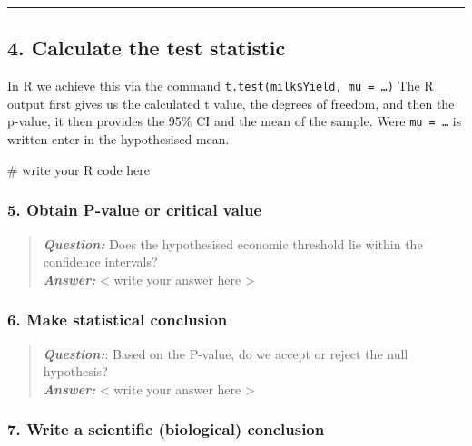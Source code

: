 \documentclass[
  10pt,
  letterpaper,
  DIV=11,
  numbers=noendperiod]{scrartcl}
\newenvironment{Shaded}{\begin{snugshade}}{\end{snugshade}}
\newcommand{\CommentTok}[1]{\textcolor[rgb]{0.37,0.37,0.37}{#1}}
\begin{document}
\begin{center}\rule{0.5\linewidth}{0.5pt}\end{center}

\hypertarget{calculate-the-test-statistic}{%
\subsection{4. Calculate the test
statistic}\label{calculate-the-test-statistic}}

In R we achieve this via the command
\texttt{t.test(milk\$Yield,\ mu\ =\ …)} The R output first gives us the
calculated t value, the degrees of freedom, and then the p-value, it
then provides the 95\% CI and the mean of the sample. Were
\texttt{mu\ =\ …} is written enter in the hypothesised mean.

\begin{Shaded}
\begin{Highlighting}[]
\CommentTok{\# write your R code here}
\end{Highlighting}
\end{Shaded}

\hypertarget{obtain-p-value-or-critical-value}{%
\subsubsection{5. Obtain P-value or critical
value}\label{obtain-p-value-or-critical-value}}

\begin{quote}
\textbf{\emph{Question:}} Does the hypothesised economic threshold lie
within the confidence intervals?\\
\textbf{\emph{Answer:}} \textless{} write your answer here
\textgreater{}
\end{quote}

\hypertarget{make-statistical-conclusion}{%
\subsubsection{6. Make statistical
conclusion}\label{make-statistical-conclusion}}

\begin{quote}
\textbf{\emph{Question:}}: Based on the P-value, do we accept or reject
the null hypothesis?\\
\textbf{\emph{Answer:}} \textless{} write your answer here
\textgreater{}
\end{quote}

\hypertarget{write-a-scientific-biological-conclusion}{%
\subsubsection{7. Write a scientific (biological)
conclusion}\label{write-a-scientific-biological-conclusion}}
\end{document}
